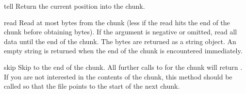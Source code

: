 \begin{methoddesc}{tell}{}
Return the current position into the chunk.
\end{methoddesc}

\begin{methoddesc}{read}{}
Read at most  bytes from the chunk (less if the read hits
the end of the chunk before obtaining  bytes).  If the
 argument is negative or omitted, read all data until the
end of the chunk.  The bytes are returned as a string object.  An
empty string is returned when the end of the chunk is encountered
immediately.
\end{methoddesc}

\begin{methoddesc}{skip}{}
Skip to the end of the chunk.  All further calls to 
for the chunk will return .  If you are not interested in the
contents of the chunk, this method should be called so that the file
points to the start of the next chunk.
\end{methoddesc}
